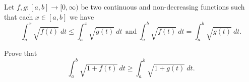 Let $f,g:[a,b]\to [0,\infty)$ be two continuous and non-decreasing functions such that each $x\in [a,b]$ we have
\[ \int^x_a \sqrt { f(t) }\ dt \leq \int^x_a \sqrt { g(t) }\ dt  \ \  \textrm{and}\ \int^b_a \sqrt {f(t)}\ dt = \int^b_a \sqrt { g(t)}\ dt. \]

Prove that
\[ \int^b_a \sqrt { 1+ f(t) }\ dt \geq \int^b_a \sqrt { 1 + g(t) }\ dt. \]